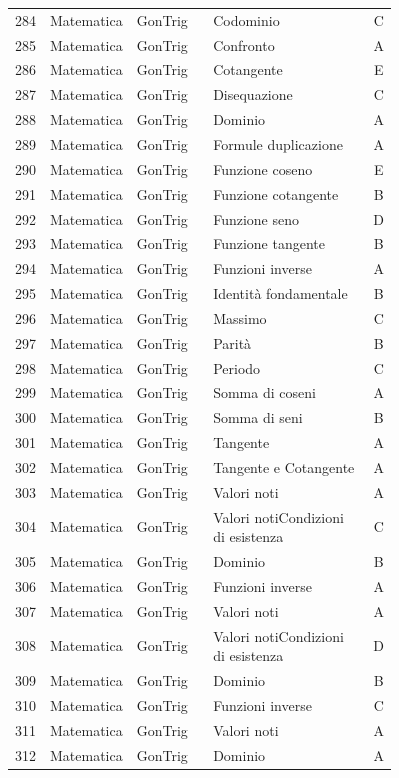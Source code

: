 \documentclass[20pt, a4paper]{article}
\begin{document}
\begin{longtable}{@{}r>{\raggedright\arraybackslash}p{0.14\linewidth}>{\raggedright\arraybackslash}p{0.20\linewidth}>{\raggedright\arraybackslash}p{0.42\linewidth}c@{}}
284 & Matematica & GonTrig & Codominio & C \\
285 & Matematica & GonTrig & Confronto & A \\
286 & Matematica & GonTrig & Cotangente & E \\
287 & Matematica & GonTrig & Disequazione & C \\
288 & Matematica & GonTrig & Dominio & A \\
289 & Matematica & GonTrig & Formule duplicazione & A \\
290 & Matematica & GonTrig & Funzione coseno & E \\
291 & Matematica & GonTrig & Funzione cotangente & B \\
292 & Matematica & GonTrig & Funzione seno & D \\
293 & Matematica & GonTrig & Funzione tangente & B \\
294 & Matematica & GonTrig & Funzioni inverse & A \\
295 & Matematica & GonTrig & Identità fondamentale & B \\
296 & Matematica & GonTrig & Massimo & C \\
297 & Matematica & GonTrig & Parità & B \\
298 & Matematica & GonTrig & Periodo & C \\
299 & Matematica & GonTrig & Somma di coseni & A \\
300 & Matematica & GonTrig & Somma di seni & B \\
301 & Matematica & GonTrig & Tangente & A \\
302 & Matematica & GonTrig & Tangente e Cotangente & A \\
303 & Matematica & GonTrig & Valori noti & A \\
304 & Matematica & GonTrig & Valori notiCondizioni di esistenza & C \\
305 & Matematica & GonTrig & Dominio & B \\
306 & Matematica & GonTrig & Funzioni inverse & A \\
307 & Matematica & GonTrig & Valori noti & A \\
308 & Matematica & GonTrig & Valori notiCondizioni di esistenza & D \\
309 & Matematica & GonTrig & Dominio & B \\
310 & Matematica & GonTrig & Funzioni inverse & C \\
311 & Matematica & GonTrig & Valori noti & A \\
312 & Matematica & GonTrig & Dominio & A \\

\end{longtable}
\end{document}
